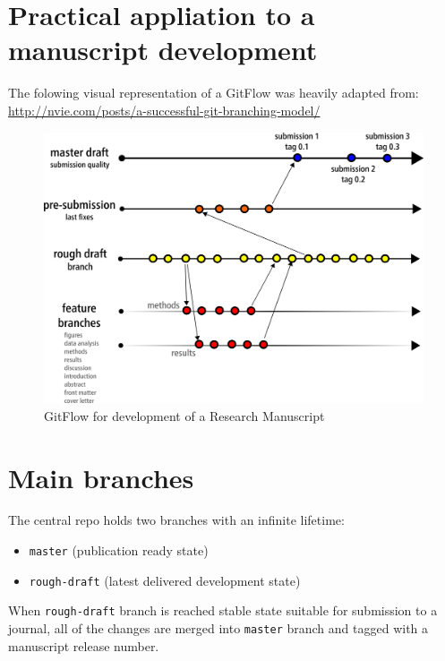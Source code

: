 \documentclass[]{book}
\providecommand{\tightlist}{%
  \setlength{\itemsep}{0pt}\setlength{\parskip}{0pt}}
\begin{document}
\section{Practical appliation to a manuscript
development}\label{practical-appliation-to-a-manuscript-development}

The folowing visual representation of a GitFlow was heavily adapted
from: \url{http://nvie.com/posts/a-successful-git-branching-model/}

\begin{figure}[htbp]
\centering
\includegraphics{images/GitFlow-Science.png}
\caption{GitFlow for development of a Research Manuscript}
\end{figure}

\section{Main branches}\label{main-branches}

The central repo holds two branches with an infinite lifetime:

\begin{itemize}
\tightlist
\item
  \texttt{master} (publication ready state)
\item
  \texttt{rough-draft} (latest delivered development state)
\end{itemize}

When \texttt{rough-draft} branch is reached stable state suitable for
submission to a journal, all of the changes are merged into
\texttt{master} branch and tagged with a manuscript release number.
\end{document}
